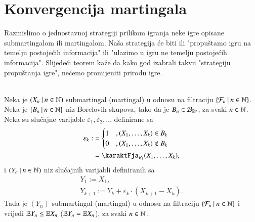 
\chapter{Konvergencija martingala}

Razmislimo o jednostavnoj strategiji prilikom igranja neke igre opisane submartingalom ili martingalom.
Na\v sa strategija \'ce biti ili "propu\v stamo igru na temelju postoje\' cih informacija" ili "ulazimo u igru ne temelju postoje\' cih informacija".
Slijede\' ci teorem ka\v ze da kako god izabrali takvu "strategiju propu\v stanja igre", ne\' cemo promijeniti prirodu igre.

\begin{tm}  \label{tm:24.1}
    \quad \\
    Neka je $({X_n} \: | \: {n \in \mathbb{N}})$ submartingal (martingal) u odnosu na filtraciju $\{{\mathcal{F}_n} \: | \: {n \in \mathbb{N}}\}$.
    Neka je $\{{B_n} \: | \: {n \in \mathbb{N}}\}$ niz Borelovih skupova, tako da je $B_n \in \mathcal{B}_{\mathbb{R}^n}$, za svaki $n \in \mathbb{N}$.
    Neka su slu\v cajne varijable $\varepsilon_1, \varepsilon_2, \ldots$ definirane sa
    \begin{equation*}
        \begin{aligned}
            \varepsilon_k :&=
        \begin{cases}
            1 &, (X_1, \ldots, X_k) \in B_k\\
            0 &, (X_1, \ldots, X_k) \notin B_k
        \end{cases}\\
        &= \karaktFja_{B_k} (X_1, \ldots, X_k),
        \end{aligned}
    \end{equation*}
    i $({Y_n} \: | \: {n \in \mathbb{N}})$ niz slu\v cajnih varijabli definiranih sa
    \begin{equation*}
        \begin{gathered}
            Y_1 := X_1,\\
            Y_{k + 1} := Y_k + \varepsilon_k \cdot (X_{k + 1} - X_k).
        \end{gathered}
    \end{equation*}
    Tada je $(Y_n)$ submartingal (martingal) u odnosu na filtraciju $\{{\mathcal{F}_n} \: | \: {n \in \mathbb{N}}\}$ i vrijedi $\mathbb{E} Y_n \leq \mathbb{E} X_n$ ($\mathbb{E} Y_n = \mathbb{E} X_n$), za svaki $n \in \mathbb{N}$.
\end{tm}

